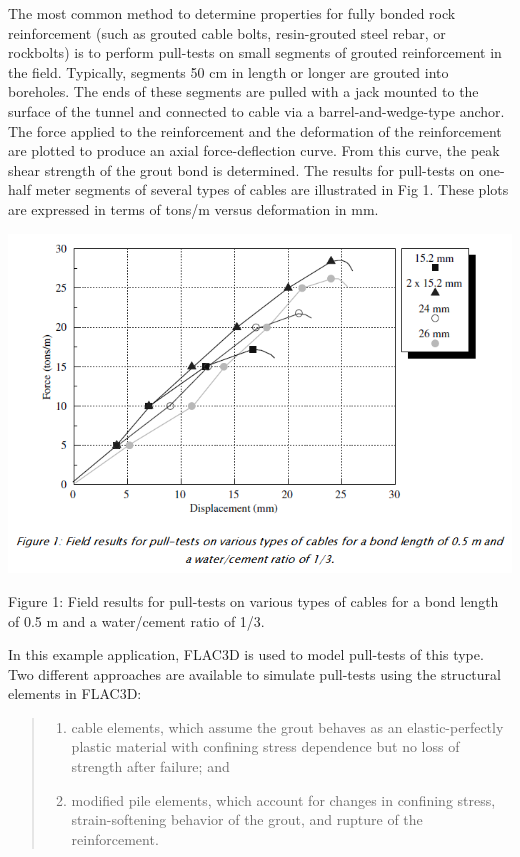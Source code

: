 \documentclass[a4paper, nobind]{templates/ociamthesis}
\begin{document}
The most common method to determine properties for fully bonded rock
reinforcement (such as grouted cable bolts, resin-grouted steel rebar,
or
rockbolts) is to perform pull-tests on small segments of grouted
reinforcement
in the field. Typically, segments 50 cm in length or longer are grouted
into
boreholes. The ends of these segments are pulled with a jack mounted to
the
surface of the tunnel and connected to cable via a barrel-and-wedge-type
anchor.
The force applied to the reinforcement and the deformation of the
reinforcement
are plotted to produce an axial force-deflection curve. From this curve,
the
peak shear strength of the grout bond is determined. The results for
pull-tests
on one-half meter segments of several types of cables are illustrated in
Fig 1. These plots are expressed in terms
of tons/m versus deformation in mm.

\includegraphics[width=1\linewidth]{myfigureeeeee/fig1}

Figure 1: Field results for pull-tests on various types of
cables for a bond length of 0.5 m and a water/cement ratio of 1/3.

In this example application, FLAC3D is used to
model pull-tests of this type. Two different approaches are available to
simulate pull-tests using the structural elements in FLAC3D:

\begin{quote}
\begin{enumerate}
\def\labelenumi{\arabic{enumi}.}
\item
  cable elements, which assume the grout behaves as an
  elastic-perfectly
  plastic material with confining stress dependence but no loss of
  strength after
  failure; and
\item
  modified pile elements, which account for changes in confining
  stress,
  strain-softening behavior of the grout, and rupture of the
  reinforcement.
\end{enumerate}
\end{quote}
\end{document}
